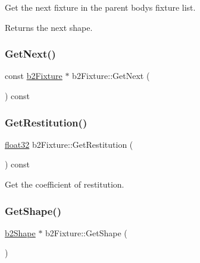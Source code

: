 Get the next fixture in the parent body\textquotesingle{}s fixture list. \begin{DoxyReturn}{Returns}
the next shape. 
\end{DoxyReturn}
\mbox{\label{classb2_fixture_a6b474fa22b49de3dbe446a67f021beb2}} 
\subsubsection{\texorpdfstring{GetNext()}{GetNext()}\hspace{0.1cm}{\footnotesize\ttfamily [2/2]}}
{\footnotesize\ttfamily const \mbox{\hyperlink{classb2_fixture}{b2\+Fixture}} $\ast$ b2\+Fixture\+::\+Get\+Next (\begin{DoxyParamCaption}{ }\end{DoxyParamCaption}) const\hspace{0.3cm}{\ttfamily [inline]}}

\mbox{\label{classb2_fixture_ac30becb6f936a9cc825952ca2b40aa14}} 
\subsubsection{\texorpdfstring{GetRestitution()}{GetRestitution()}}
{\footnotesize\ttfamily \mbox{\hyperlink{b2_settings_8h_aacdc525d6f7bddb3ae95d5c311bd06a1}{float32}} b2\+Fixture\+::\+Get\+Restitution (\begin{DoxyParamCaption}{ }\end{DoxyParamCaption}) const\hspace{0.3cm}{\ttfamily [inline]}}



Get the coefficient of restitution. 

\mbox{\label{classb2_fixture_aaa2b73fa212fa53b1c800cccd7a1d31e}} 
\subsubsection{\texorpdfstring{GetShape()}{GetShape()}\hspace{0.1cm}{\footnotesize\ttfamily [1/2]}}
{\footnotesize\ttfamily \mbox{\hyperlink{classb2_shape}{b2\+Shape}} $\ast$ b2\+Fixture\+::\+Get\+Shape (\begin{DoxyParamCaption}{ }\end{DoxyParamCaption})\hspace{0.3cm}{\ttfamily [inline]}}

